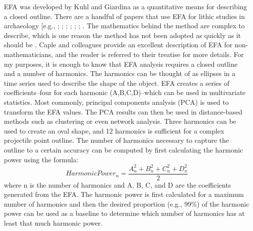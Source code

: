 \documentclass[a4paper]{article}
\begin{document}
EFA was developed by Kuhl and Giardina \autocite*{Kuhl1982-kd} as a quantitative means for describing a closed outline. There are a handful of papers that use EFA for lithic studies in archaeology {[}e.g., \textcite{Cardillo2010-ys}; \textcite{Fox2015-ox}; \textcite{Gingerich2014-cb}; \textcite{Hoggard2019-yw}; \textcite{Iovita2011-nz}; \textcite{Iovita2011-zp}; \textcite{Matzig2021-id}. The mathematics behind the method are complex to describe, which is one reason the method has not been adopted as quickly as it should be \autocite[see][]{Caple2017-mk}. Caple and colleagues \autocite{Caple2017-mk} provide an excellent description of EFA for non-mathematicians, and the reader is referred to their treatise for more details. For my purposes, it is enough to know that EFA analysis requires a closed outline and a number of harmonics. The harmonics can be thought of as ellipses in a time series used to describe the shape of the object. EFA creates a series of coefficients--four for each harmonic (A,B,C,D)--which can be used in multivariate statistics. Most commonly, principal components analysis (PCA) is used to transform the EFA values. The PCA results can then be used in distance-based methods such as clustering or even network analysis. Three harmonics can be used to create an oval shape, and 12 harmonics is sufficient for a complex projectile point outline. The number of harmonics necessary to capture the outline to a certain accuracy can be computed by first calculating the harmonic power using the formula: \[ HarmonicPower_n = \frac{A^2_n+B^2_n+C^2_n+D^2_n}{2} \] where n is the number of harmonics and A, B, C, and D are the coefficients generated from the EFA. The harmonic power is first calculated for a maximum number of harmonics and then the desired proportion (e.g., 99\%) of the harmonic power can be used as a baseline to determine which number of harmonics has at least that much harmonic power.
\end{document}
